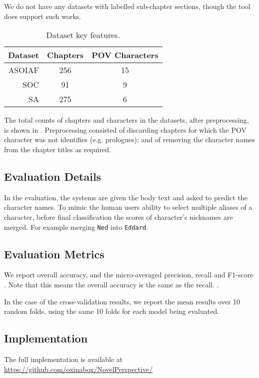 \documentclass[11pt,a4paper]{article}
\newcommand{\parencite}{\citep}
\begin{document}
We do not have any datasets with labelled sub-chapter sections,
though the tool does support such works.


\begin{table}
	\begin{tabular}{rcc}
		Dataset & Chapters & POV Characters\\
		\toprule
		ASOIAF  & 256	&	15\\
		SOC		& 91	&	9\\
		SA		& 275	&	6
	\end{tabular}
	\caption{Dataset key features. \label{tbl:datasets}}
\end{table}

The total counts of chapters and characters in the datasets, after preprocessing, is shown in .
Preprocessing consisted of  discarding chapters for which the POV character was not identifies (e.g. prologues); and of removing the character names from the chapter titles as required.

\subsection{Evaluation Details}
In the evaluation, the systems are given the body text and asked to predict the character names.
To mimic the human users ability to select multiple aliases of a character, before final classification the scores of character's nicknames are merged.
For example merging \texttt{Ned} into \texttt{Eddard}.

\subsection{Evaluation Metrics}
We report overall accuracy, and the micro-averaged precision, recall and F1-score \parencite{sokolova2009systematica}.
Note that this means the overall accuracy is the same as the recall.
.

In the case of the cross-validation results, we report the mean results over 10 random folds, using the same 10 folds for each model being evaluated.

\subsection{Implementation}
The full implementation is available at \url{https://github.com/oxinabox/NovelPerspective/}
\end{document}
